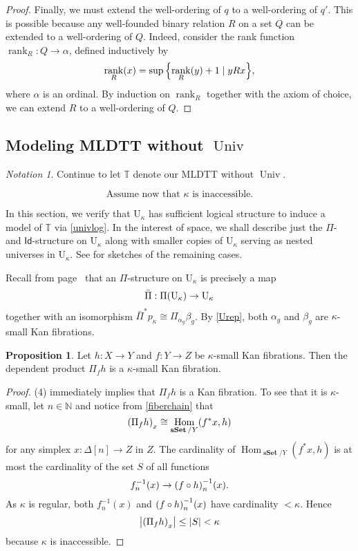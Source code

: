 \documentclass[10pt,letterpaper,cm]{nupset}
\theoremstyle{definition}
\theoremstyle{theorem}
\newtheorem{prop}[definition]{Proposition}
\theoremstyle{remark}
\newtheorem*{notation}{Notation}
\newcommand{\id}{\mathsf{Id}}
\newcommand{\0}{\mathbf{0}}
\newcommand{\1}{\mathbf{1}}
\newcommand{\2}{\mathbf{2}}
\DeclareMathOperator{\univ}{\mathrm{Univ}}
\DeclareMathOperator{\sset}{\mathbf{sSet}}
\DeclareMathOperator{\rank}{rank}
\newcommand{\N}{\mathbb N}
\newcommand{\T}{\mathbb T}
\DeclareMathOperator{\Hom}{Hom}
\begin{document}
\begin{proof}
\medskip



Finally, we must extend the well-ordering of $q$ to a well-ordering of $q'$. This is possible because any well-founded binary relation $R$ on a set $Q$ can be extended to a well-ordering of $Q$. Indeed, consider  the rank function $\rank_R: Q\to \alpha$, defined inductively by 
\[
\rank_R(x) = \sup{\mleft\{\rank_R(y)+1\mid {yRx}\mright\}},
\] where $\alpha$ is an ordinal. By induction on $\rank_R$ together with the axiom of choice, we can extend $R$ to a well-ordering of $Q$.
\end{proof} 

\subsection{Modeling MLDTT without $\univ$}\label{smod}

\begin{notation}
Continue to let $\T$ denote our MLDTT without $\univ$.
\end{notation}

\[
\text{Assume now that $\kappa$ is inaccessible.}
\]

\smallskip

In this section, we verify that $\mathrm{U}_{\kappa}$ has sufficient logical structure to induce a model of $\T$ via \cref{univlog}. In the interest of space, we shall describe just the $\Pi$- and $\id$-structure on $\mathrm{U}_{\kappa}$ along with smaller copies of  $\mathrm{U}_{\kappa}$ serving as nested universes in  $\mathrm{U}_{\kappa}$. See \cite[Theorem 2.3.4]{KL} for sketches of the remaining cases. 


\bigskip

Recall from page~\pageref{depprods} that  an $\Pi$-structure on $\mathrm{U}_{\kappa}$ is precisely a map $$\bar{\Pi} : \Pi\mleft(\mathrm{U}_{\kappa}\mright) \to \mathrm{U}_{\kappa}$$ together with an isomorphism $\bar{\Pi}^{\ast}{p_{\kappa}}\cong \Pi_{\alpha_g}\beta_g$. By \cref{Urep}, both $\alpha_g$ and $\beta_g$ are  $\kappa$-small Kan fibrations.

\begin{prop}\label{depprodsmall}
Let $h : X \to Y$ and $f: Y \to Z$ be $\kappa$-small Kan fibrations. Then the dependent product $\Pi_f{h}$ is a $\kappa$-small Kan fibration.  
\end{prop}
\begin{proof}
 (4) immediately implies that $\Pi_f{h}$ is a Kan fibration. To see that it is $\kappa$-small,  let $n\in \N$ and notice from \eqref{fiberchain} that
 \[
\mleft(\Pi_f{h}\mright)_x \cong \Hom_{\sset/Y}(f^{\ast}{x}, h)
 \] for any simplex $x: \Delta[n] \to Z$ in $Z$. The cardinality of $\Hom_{\sset/Y}(f^{\ast}{x}, h)$ is at most the cardinality of the set $S$ of all functions
 \[
f_n^{-1}(x) \to \mleft(f\circ h\mright)_n^{-1}(x)
 .\] As $\kappa$ is regular, both $f_n^{-1}(x)$ and $\mleft(f\circ h\mright)_n^{-1}(x) $ have cardinality $<\kappa$. Hence $$\mleft\lvert{\mleft(\Pi_f{h}\mright)_x}\mright\rvert \leq \mleft\lvert{S}\mright\rvert <\kappa$$ because $\kappa$ is inaccessible.
 \end{proof}
\end{document}
